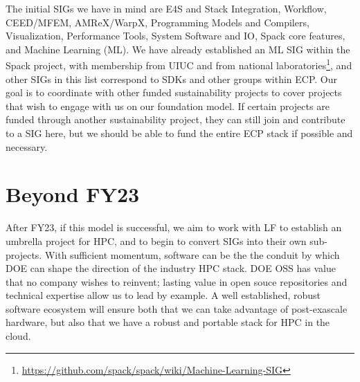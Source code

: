 \documentclass[11pt]{article}
\begin{document}
The initial SIGs we have in mind are E4S and Stack Integration, Workflow, CEED/MFEM,
AMReX/WarpX, Programming Models and Compilers, Visualization, Performance Tools, System
Software and IO, Spack core features, and Machine Learning (ML). We have already
established an ML SIG within the Spack project, with membership from UIUC and from
national
laboratories\footnote{\href{https://github.com/spack/spack/wiki/Machine-Learning-SIG}{https://github.com/spack/spack/wiki/Machine-Learning-SIG}},
and other SIGs in this list correspond to SDKs and other groups within ECP. Our goal is
to coordinate with other funded sustainability projects to cover projects that wish to
engage with us on our foundation model. If certain projects are funded through another
sustainability project, they can still join and contribute to a SIG here, but we should
be able to fund the entire ECP stack if possible and necessary.

\section{Beyond FY23}

After FY23, if this model is successful, we aim to work with LF to establish an umbrella
project for HPC, and to begin to convert SIGs into their own sub-projects. With
sufficient momentum, software can be the the conduit by which DOE can shape the
direction of the industry HPC stack. DOE OSS has value that no company wishes to
reinvent; lasting value in open souce repositories and technical expertise allow us to
lead by example. A well established, robust software ecosystem will ensure both that we
can take advantage of post-exascale hardware, but also that we have a robust and
portable stack for HPC in the cloud.




%
%  


\end{document}
